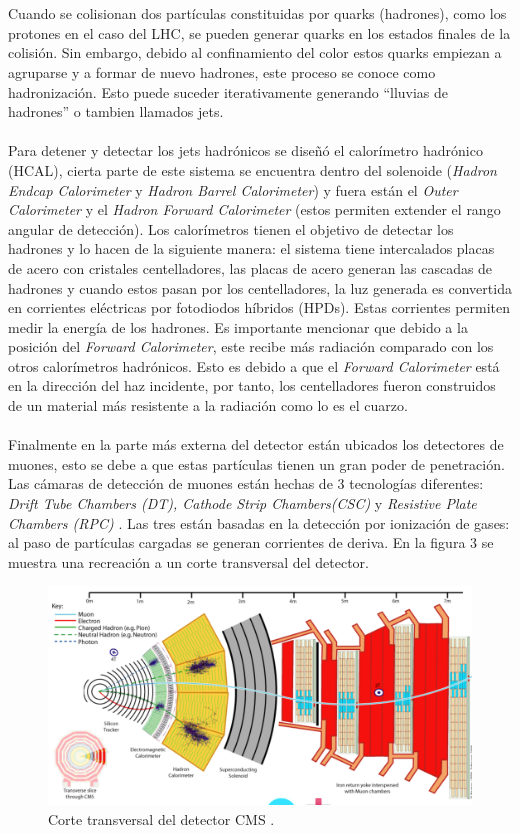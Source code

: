 \\
\\
Cuando se colisionan dos partículas constituidas por quarks (hadrones), como los protones en el caso del LHC, se pueden generar quarks en los estados finales de la colisión. Sin embargo, debido al confinamiento del color estos quarks empiezan a agruparse y a formar de nuevo hadrones, este proceso se conoce como hadronización. Esto puede suceder iterativamente generando ``lluvias de hadrones'' o tambien llamados jets.
\\
\\
Para detener y detectar los jets hadrónicos se diseñó el calorímetro hadrónico (HCAL), cierta parte de este sistema se encuentra dentro del solenoide (\textit{Hadron Endcap Calorimeter} y \textit{Hadron Barrel Calorimeter}) y fuera están el \textit{Outer Calorimeter} y el \textit{Hadron Forward Calorimeter} (estos permiten extender el rango angular de detección). Los calorímetros tienen el objetivo de detectar los hadrones y lo hacen de la siguiente manera: el sistema tiene intercalados placas de acero con cristales centelladores, las placas de acero generan las cascadas de hadrones y cuando estos pasan por los centelladores, la luz generada es convertida en corrientes eléctricas por fotodiodos híbridos (HPDs). Estas corrientes permiten medir la energía de los hadrones. Es importante mencionar que debido a la posición del \textit{Forward Calorimeter}, este recibe más radiación comparado con los otros calorímetros hadrónicos. Esto es debido a que el \textit{Forward Calorimeter} está en la dirección del haz incidente, por tanto, los centelladores fueron construidos de un material más resistente a la radiación como lo es el cuarzo.
\\
\\
Finalmente en la parte más externa del detector están ubicados los detectores de muones, esto se debe a que estas partículas tienen un gran poder de penetración. Las cámaras de detección de muones están hechas de 3 tecnologías diferentes: \textit{Drift Tube Chambers (DT), Cathode Strip Chambers(CSC)} y \textit{Resistive Plate Chambers (RPC)}	. Las tres están basadas en la detección por ionización de gases: al paso de partículas cargadas se generan corrientes de deriva. En la figura 3 se muestra una recreación a un corte transversal del detector.
\begin{figure}
\centering
\includegraphics[width=15cm]{F3.png}
\caption{\label{fig:frog} Corte transversal del detector CMS \cite{Bayatian:2006nff}.}
\end{figure}

